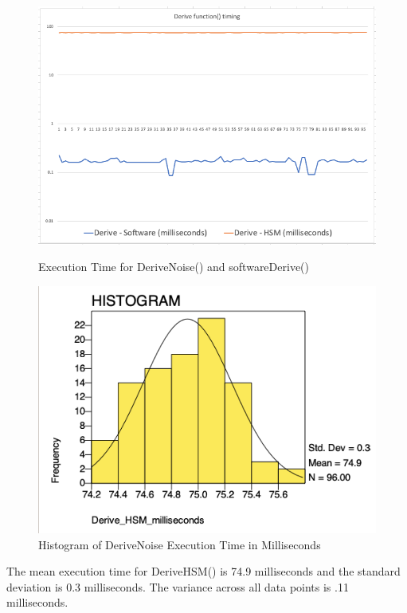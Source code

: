 \documentclass [11pt, proquest] {uwthesis}[2020/02/24]
\begin{document}
\begin{figure}
\centering
\begin{minipage}{.5\textwidth}
  \centering
  \includegraphics[width=1\linewidth]{paper/images/deriveFunctiongraph.png}
  \caption{Execution Time for DeriveNoise() and softwareDerive()}
  \label{fig:funcTimeGraph}
\end{minipage}%
\begin{minipage}{.5\textwidth}
  \centering
  \includegraphics[width=1\linewidth]{paper/images/DeriveNoise freq.png}
  \caption{Histogram of DeriveNoise Execution Time in Milliseconds}
  \label{fig:hsmTimeGraph}
\end{minipage}
\end{figure}

The mean execution time for DeriveHSM() is 74.9 milliseconds and the standard deviation is 0.3 milliseconds. The variance across all data points is .11 milliseconds. 
\end{document}
